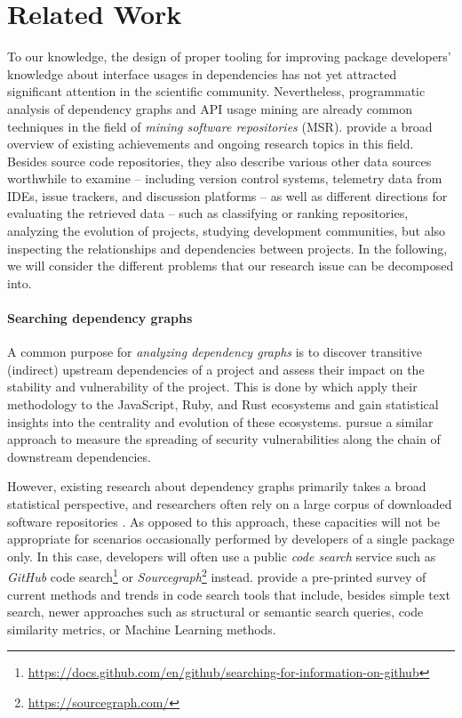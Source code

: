 \section{Related Work}
\label{sec:related_work}

To our knowledge, the design of proper tooling for improving package developers' knowledge about interface usages in dependencies has not yet attracted significant attention in the scientific community.
Nevertheless, programmatic analysis of dependency graphs and API usage mining are already common techniques in the field of \emph{mining software repositories} (MSR).
\citet{chaturvedi2013tools} provide a broad overview of existing achievements and ongoing research topics in this field.
Besides source code repositories, they also describe various other data sources worthwhile to examine -- including version control systems, telemetry data from IDEs, issue trackers, and discussion platforms -- as well as different directions for evaluating the retrieved data -- such as classifying or ranking repositories, analyzing the evolution of projects, studying development communities, but also inspecting the relationships and dependencies between projects.
In the following, we will consider the different problems that our research issue can be decomposed into.

\paragraph{Searching dependency graphs}
\label{sec:related_work/dependencies}

A common purpose for \emph{analyzing dependency graphs} is to discover transitive (indirect) upstream dependencies of a project and assess their impact on the stability and vulnerability of the project.
This is done by \citet{kikas2017structure} which apply their methodology to the JavaScript, Ruby, and Rust ecosystems and gain statistical insights into the centrality and evolution of these ecosystems.
\citet{decan2018impact} pursue a similar approach to measure the spreading of security vulnerabilities along the chain of downstream dependencies.

However, existing research about dependency graphs primarily takes a broad statistical perspective, and researchers often rely on a large corpus of downloaded software repositories \citep{abdalkareem2017developers,katz2020libraries,kikas2017structure}.
As opposed to this approach, these capacities will not be appropriate for scenarios occasionally performed by developers of a single package only.
In this case, developers will often use a public \emph{code search} service such as \emph{GitHub} code search\footnote{\url{https://docs.github.com/en/github/searching-for-information-on-github}} or \emph{Sourcegraph}\footnote{\url{https://sourcegraph.com/}} instead.
\citet{liu2020opportunities} provide a pre-printed survey of current methods and trends in code search tools that include, besides simple text search, newer approaches such as structural or semantic search queries, code similarity metrics, or Machine Learning methods.

